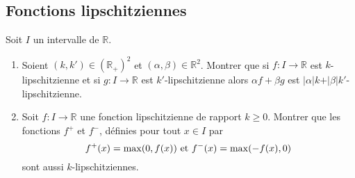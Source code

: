 \documentclass[a4paper,twoside,french,11pt]{VcCours}
\begin{document}
%


\subsection{Fonctions lipschitziennes}



\begin{Exercice}{} Soit $I$ un intervalle de $\mathbb{R}$.

\begin{enumerate}
\item Soient $(k,k') \in (\mathbb{R}_+)^2$ et $(\alpha, \beta) \in \mathbb{R}^2$. Montrer que si $f : I \rightarrow \mathbb{R}$ est $k$-lipschitzienne et si $g : I \rightarrow \mathbb{R}$ est $k'$-lipschitzienne alors $\alpha f+ \beta g$ est $\vert \alpha \vert k  + \vert \beta \vert k'$-lipschitzienne.
\item Soit $f : I \rightarrow \mathbb{R}$ une fonction lipschitzienne de rapport $k \geq 0$. Montrer que les fonctions $f^+$ et $f^{-}$, définies pour tout $x \in I$ par 
$$ f^+(x)= \max(0,f(x)) \hbox{ et } f^{-}(x) = \max(-f(x),0) $$
sont aussi $k$-lipschitziennes.
\end{enumerate}
\end{Exercice}
\end{document}
